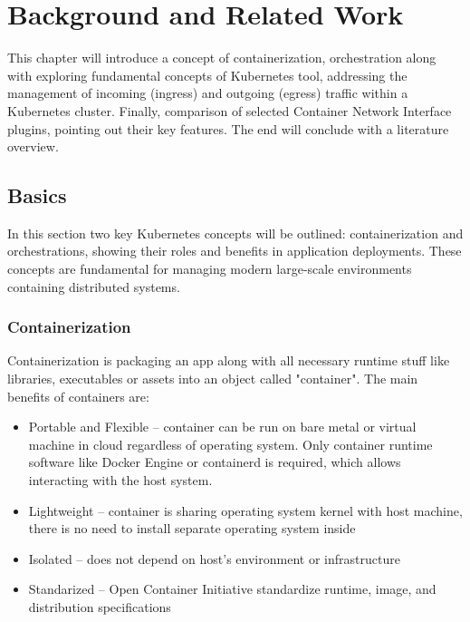 \chapter{Background and Related Work}
\label{cha:background}

This chapter will introduce a concept of containerization, orchestration along with exploring fundamental concepts of Kubernetes tool, addressing the management of incoming (ingress) and outgoing (egress) traffic within a Kubernetes cluster. Finally, comparison of selected Container Network Interface plugins, pointing out their key features. The end will conclude with a literature overview.


\section{Basics}
\label{sec:basics}

In this section two key Kubernetes concepts will be outlined: containerization and orchestrations, showing their roles and benefits in application deployments. These concepts are fundamental for managing modern large-scale environments containing distributed systems.

\subsection{Containerization}
\label{sec:containerization}

Containerization is packaging an app along with all necessary runtime stuff like libraries, executables or assets into an object called "container". The main benefits of containers are\cite{RedhatContainerization}: 

\begin{itemize} 
    \item Portable and Flexible -- container can be run on bare metal or virtual machine in cloud regardless of operating system. Only container runtime software like Docker Engine or containerd is required, which allows interacting with the host system. 

    \item Lightweight -- container is sharing operating system kernel with host machine, there is no need to install separate operating system inside 

    \item Isolated -- does not depend on host's environment or infrastructure 

    \item Standarized -- Open Container Initiative standardize runtime, image, and distribution specifications 

\end{itemize} 


